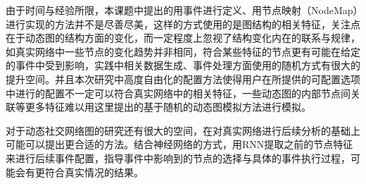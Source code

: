 由于时间与经验所限，本课题中提出的用事件进行定义、用节点映射（NodeMap）进行实现的方法并不是尽善尽美，这样的方式使用的是图结构的相关特征，关注点在于动态图的结构方面的变化，而一定程度上忽视了结构变化内在的联系与规律，如真实网络中一些节点的变化趋势并非相同，符合某些特征的节点更有可能在给定的事件中受到影响，实践中相关数据生成、事件处理方面使用的随机方式有很大的提升空间。并且本次研究中高度自由化的配置方法使得用户在所提供的可配置选项中进行的配置不一定可以符合真实网络中的相关特征，一些动态图的内部节点间关联等更多特征难以用这里提出的基于随机的动态图模拟方法进行模拟。

对于动态社交网络图的研究还有很大的空间，在对真实网络进行后续分析的基础上可能可以提出更合适的方法。结合神经网络的方式，用RNN提取之前的节点特征来进行后续事件配置，指导事件中影响到的节点的选择与具体的事件执行过程，可能会有更符合真实情况的结果。